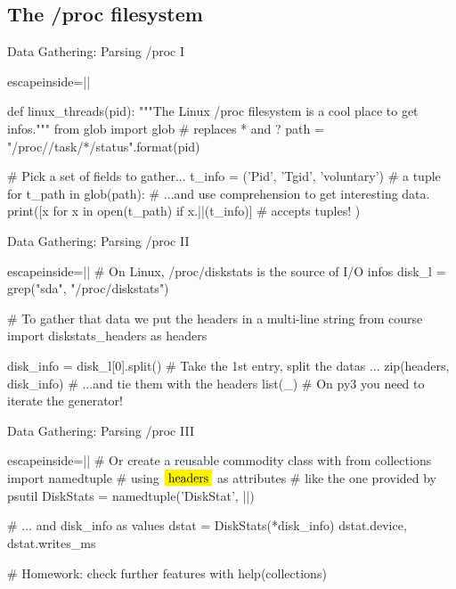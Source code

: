 \subsection{The /proc filesystem}
\begin{pyframe}{Data Gathering: Parsing /proc I}
\begin{pycode*}{escapeinside=||}

def linux_threads(pid):
  """The Linux /proc filesystem is a cool place to get infos."""
  from glob import glob  # replaces * and ?
  path = "/proc/{}/task/*/status".format(pid)
  
  # Pick a set of fields to gather...
  t_info = ('Pid', 'Tgid', 'voluntary') # a tuple
  for t_path in glob(path):
    # ...and use comprehension to get interesting data.
    print([x for x in open(t_path) 
        if x.||(t_info)] #  accepts tuples!
    )
\end{pycode*}
\end{pyframe}



\begin{pyframe}{Data Gathering: Parsing /proc II}
\begin{pycode*}{escapeinside=||}
# On Linux, /proc/diskstats is the source of I/O infos
disk_l = grep("sda", "/proc/diskstats")

# To gather that data we put the headers in a multi-line string
from course import diskstats_headers as headers
        
disk_info = disk_l[0].split() # Take the 1st entry, split the datas ...
zip(headers, disk_info)          # ...and tie them with the headers
list(_) # On py3 you need to iterate the generator!
\end{pycode*}
\end{pyframe}

\begin{pyframe}{Data Gathering: Parsing /proc III}
\begin{pycode*}{escapeinside=||}
# Or create a reusable commodity class with
from collections import namedtuple
# using $\pyver{headers}$ as attributes
#  like the one provided by psutil
DiskStats = namedtuple('DiskStat', ||)

# ... and disk_info as values
dstat = DiskStats(*disk_info)
dstat.device, dstat.writes_ms

# Homework: check further features with
help(collections) 
\end{pycode*}
\end{pyframe}


\iffalse
\begin{pyframe}{Data Gathering: subprocess}
\begin{pycode}
# foo
\end{pycode}
\end{pyframe}

\fi
